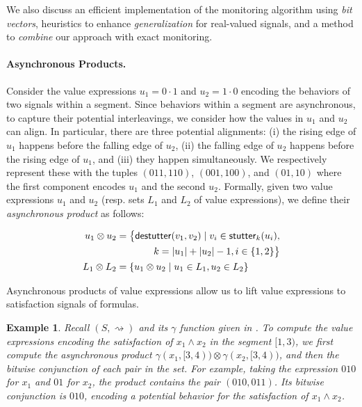 \documentclass[iicol,lineno]{sn-jnl}
\renewcommand{\cref}{\Cref}
\newcommand{\hb}{\rightsquigarrow}
\newcommand{\destutter}{\mathsf{destutter}}
\newcommand{\stutter}{\mathsf{stutter}}
\newcommand{\?}{\text{?}}
\newcommand{\suchthat}{\;\ifnum\currentgrouptype=16 \middle\fi|\;}
\let\st\suchthat
\newtheorem{example}{Example}
\begin{document}
	We also discuss an efficient implementation of the monitoring algorithm using \emph{bit vectors}, heuristics to enhance \emph{generalization} for real-valued signals, and a method to \emph{combine} our approach with exact monitoring.
	
	\paragraph*{Asynchronous Products.}
	Consider the value expressions $u_1 = 0 \cdot 1$ and $u_2 = 1 \cdot 0$ encoding the behaviors of two signals within a segment.
	Since behaviors within a segment are asynchronous, to capture their potential interleavings, we consider how the values in $u_1$ and $u_2$ can align.
	In particular, there are three potential alignments:
	(i) the rising edge of $u_1$ happens before the falling edge of $u_2$,
	(ii) the falling edge of $u_2$ happens before the rising edge of $u_1$, and
	(iii) they happen simultaneously.
	We respectively represent these with the tuples $(011, 110)$, $(001, 100)$, and $(01, 10)$ where the first component encodes $u_1$ and the second $u_2$.
	Formally, given two value expressions $u_1$ and $u_2$ (resp.  sets $L_1$ and $L_2$ of value expressions), we define their \emph{asynchronous product} as follows:
	
	\begin{align*}
		u_1 \otimes u_2 &=
		\begin{aligned}[t]
			\big\{ \destutter(v_1, v_2) \st v_i \in \stutter_k(u_i), \\
			k = |u_1| + |u_2| - 1, i \in \{1,2\} \big\}
		\end{aligned}\\
		L_1 \otimes L_2 &= \{ u_1 \otimes u_2 \st u_1 \in L_1, u_2 \in L_2 \}
	\end{align*}
	
	Asynchronous products of value expressions allow us to lift value expressions to satisfaction signals of formulas.
	
	\begin{example} \label{ex:asyncprod}
		Recall $(S, {\hb})$ and its $\gamma$ function given in \cref{fig:csve}.
		To compute the value expressions encoding the satisfaction of $x_1 \land x_2$ in the segment $[1,3)$, we first compute the asynchronous product $\gamma(x_1, [3,4)) \otimes \gamma(x_2, [3,4))$, and then the bitwise conjunction of each pair in the set.
		For example, taking the expression $0  1  0$ for $x_1$ and $0  1$ for $x_2$, the product contains the pair $(010, 011)$.
		Its bitwise conjunction is $0  1  0$, encoding a potential behavior for the satisfaction of $x_1 \land x_2$.
	\end{example}
	
\end{document}

